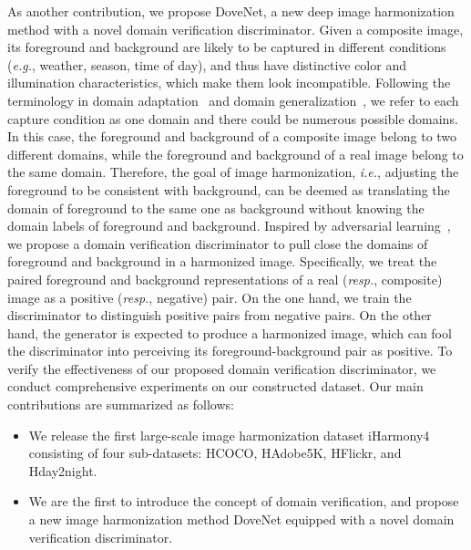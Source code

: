 \documentclass[10pt,twocolumn,letterpaper]{article}
\begin{document}
As another contribution, we propose DoveNet, a new deep image harmonization method with a novel domain verification discriminator. Given a composite image, its foreground and background are likely to be captured in different conditions (\emph{e.g.}, weather, season, time of day), and thus have distinctive color and illumination characteristics, which make them look incompatible. Following the terminology in domain adaptation~\cite{patel2015visual,dafv2016} and domain generalization~\cite{wsdg2015,mvdg2015}, we refer to each capture condition as one domain and there could be numerous possible domains. In this case, the foreground and background of a composite image belong to two different domains, while the foreground and background of a real image belong to the same domain. Therefore, the goal of image harmonization, \emph{i.e.}, adjusting the foreground to be consistent with background, can be deemed as translating the domain of foreground to the same one as background without knowing the domain labels of foreground and background. Inspired by adversarial learning~\cite{goodfellow2014generative,pixelGAN}, we propose a domain verification discriminator to pull close the domains of foreground and background in a harmonized image. Specifically, we treat the paired foreground and background representations of a real (\emph{resp.}, composite) image as a positive (\emph{resp.}, negative) pair. On the one hand, we train the discriminator to distinguish positive pairs from negative pairs. On the other hand, the generator is expected to produce a harmonized image, which can fool the discriminator into perceiving its foreground-background pair as positive. To verify the effectiveness of our proposed domain verification discriminator, we conduct comprehensive experiments on our constructed dataset. Our main contributions are summarized as follows:
\begin{itemize}
\item We release the first large-scale image harmonization dataset iHarmony4 consisting of four sub-datasets: HCOCO, HAdobe5K, HFlickr, and Hday2night.
\item We are the first to introduce the concept of domain verification, and propose a new image harmonization method DoveNet equipped with a novel domain verification discriminator.
\end{itemize}
\end{document}
